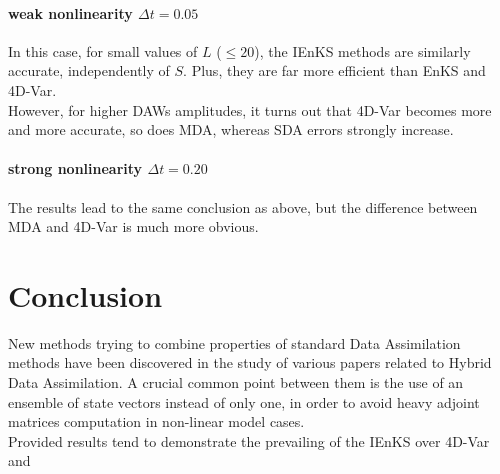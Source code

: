\documentclass[a4,12pt]{article}
\numberwithin{equation}{section}
\begin{document}
\paragraph{weak nonlinearity $\Delta t = 0.05$}
In this case, for small values of $L$ ($\leq 20$), the IEnKS methods are similarly accurate, independently of $S$. Plus, they are far more efficient than EnKS and 4D-Var. \\
However, for higher DAWs amplitudes, it turns out that 4D-Var becomes more and more accurate, so does MDA, whereas SDA errors strongly increase.

\paragraph{strong nonlinearity $\Delta t = 0.20$}
The results lead to the same conclusion as above, but the difference between MDA and 4D-Var is much more obvious.


\section{Conclusion} 
New methods trying to combine properties of standard Data Assimilation methods have been discovered in the study of various papers related to Hybrid Data Assimilation. A crucial common point between them is the use of an ensemble of state vectors instead of only one, in order to avoid heavy adjoint matrices computation in non-linear model cases. \\
Provided results tend to demonstrate the prevailing of the IEnKS over 4D-Var and

\newpage


\end{document}
